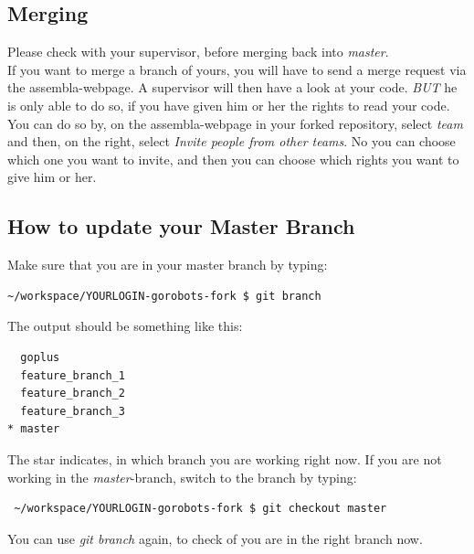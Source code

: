 \subsection{Merging}
Please check with your supervisor, before merging back into \emph{master}. \\
If you want to merge a branch of yours, you will have to send a merge request via the assembla-webpage. A supervisor will then have a look at your code. \emph{BUT} he is only able to do so,
if you have given him or her the rights to read your code. You can do so by, on the assembla-webpage in your forked repository, select \emph{team} and then, on the right, select \emph{Invite people from other teams}.
No you can choose which one you want to invite, and then you can choose which rights you want to give him or her.

\subsection{How to update your Master Branch}

Make sure that you are in your master branch by typing:
\begin{lstlisting}
~/workspace/YOURLOGIN-gorobots-fork $ git branch
\end{lstlisting}
The output should be something like this:
\begin{lstlisting}
  goplus
  feature_branch_1
  feature_branch_2
  feature_branch_3
* master 
\end{lstlisting}
The star indicates, in which branch you are working right now. If you are not working in the \emph{master}-branch, switch to the branch by typing:
\begin{lstlisting}
 ~/workspace/YOURLOGIN-gorobots-fork $ git checkout master
\end{lstlisting}
You can use \emph{git branch} again, to check of you are in the right branch now.

